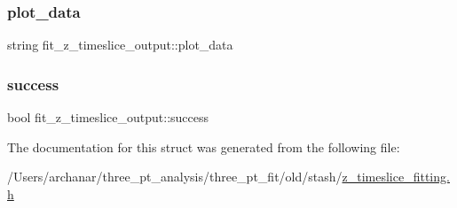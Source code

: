 \mbox{\label{structfit__z__timeslice__output_aac45ffb693f27884218fbf5bbe2cd560}} 
\subsubsection{\texorpdfstring{plot\_data}{plot\_data}}
{\footnotesize\ttfamily string fit\+\_\+z\+\_\+timeslice\+\_\+output\+::plot\+\_\+data}

\mbox{\label{structfit__z__timeslice__output_af3748e9f9f7c94ef69034e0c480e43ae}} 
\subsubsection{\texorpdfstring{success}{success}}
{\footnotesize\ttfamily bool fit\+\_\+z\+\_\+timeslice\+\_\+output\+::success}



The documentation for this struct was generated from the following file\+:\begin{DoxyCompactItemize}
\item 
/\+Users/archanar/three\+\_\+pt\+\_\+analysis/three\+\_\+pt\+\_\+fit/old/stash/\mbox{\hyperlink{old_2stash_2z__timeslice__fitting_8h}{z\+\_\+timeslice\+\_\+fitting.\+h}}\end{DoxyCompactItemize}
